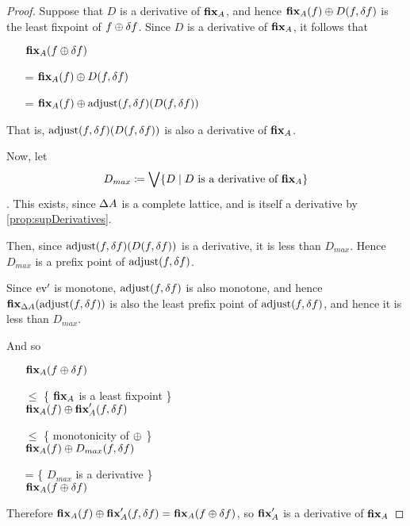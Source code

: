 \begin{proof}
  Suppose that $D$ is a derivative of $\textbf{fix}_A$, and hence $\textbf{fix}_A(f) \oplus D(f,
  \delta f)$ is the least fixpoint of $f \oplus \delta f$. 
  Since $D$ is a derivative of $\textbf{fix}_A$, it follows that 
  \begin{itemize}
    \item[ ]$\textbf{fix}_A (f \oplus \delta f)$
    \item[=]$\textbf{fix}_A(f) \oplus D(f, \delta f)$
    \item[=]$\textbf{fix}_A(f) \oplus \operatorname{adjust}(f, \delta f)(D(f, \delta f))$
  \end{itemize}

  That is, $\operatorname{adjust}(f, \delta f)(D(f, \delta f))$ is also a
  derivative of $\textbf{fix}_A$.

  Now, let $$D_{max} \coloneqq \bigvee \{D \mid D \textrm{ is a derivative of }
  \textbf{fix}_A \}$$. This exists, since $\Delta A$ is a complete lattice, and
  is itself a derivative by \cref{prop:supDerivatives}.

  Then, since 
  $\operatorname{adjust}(f, \delta f)(D(f, \delta f))$ is a
  derivative, it is less than $D_{max}$. Hence $D_{max}$ is a prefix point of
  $\operatorname{adjust}(f, \delta f)$.

  Since $\operatorname{ev}'$ is monotone, $\operatorname{adjust}(f, \delta f)$ is also monotone, and
  hence $\textbf{fix}_{\Delta A}(\operatorname{adjust}(f, \delta f))$ is also the
  least prefix point of $\operatorname{adjust}(f, \delta f)$, and hence it is less
  than $D_{max}$.

  And so 
  \begin{itemize}
    \item[ ]
      $\textbf{fix}_A(f \oplus \delta f)$
    \item[$\leq$]\{ $\textbf{fix}_A$ is a least fixpoint \}\\
      $\textbf{fix}_A(f) \oplus \textbf{fix}_A'(f, \delta f)$
    \item[$\leq$]\{ monotonicity of $\oplus$ \}\\
      $\textbf{fix}_A(f) \oplus D_{max}(f, \delta f)$
    \item[=]\{ $D_{max}$ is a derivative \}\\
      $\textbf{fix}_A(f \oplus \delta f)$
  \end{itemize}

  Therefore $\textbf{fix}_A(f) \oplus \textbf{fix}_A'(f, \delta f) =
  \textbf{fix}_A(f \oplus \delta f)$, so $\textbf{fix}_A'$ is a derivative of $\textbf{fix}_A$
\end{proof}

